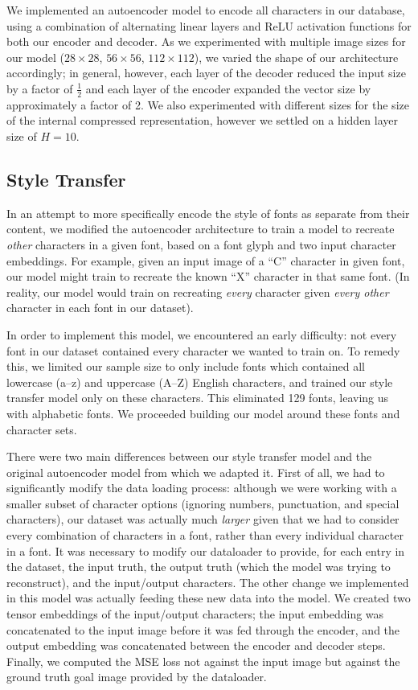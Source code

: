We implemented an autoencoder model to encode all characters in our database, using a combination of alternating linear layers and ReLU activation functions for both our encoder and decoder. As we experimented with multiple image sizes for our model ($28\times28$, $56\times56$, $112\times112$), we varied the shape of our architecture accordingly; in general, however, each layer of the decoder reduced the input size by a factor of $\frac{1}{2}$ and each layer of the encoder expanded the vector size by approximately a factor of 2. We also experimented with different sizes for the size of the internal compressed representation, however we settled on a hidden layer size of $H=10$.

\subsection{Style Transfer}

In an attempt to more specifically encode the style of fonts as separate from their content, we modified the autoencoder architecture to train a model to recreate \textit{other} characters in a given font, based on a font glyph and two input character embeddings. For example, given an input image of a ``C'' character in given font, our model might train to recreate the known ``X'' character in that same font. (In reality, our model would train on recreating \textit{every} character given \textit{every other} character in each font in our dataset).

In order to implement this model, we encountered an early difficulty: not every font in our dataset contained every character we wanted to train on. To remedy this, we limited our sample size to only include fonts which contained all lowercase (a–z) and uppercase (A–Z) English characters, and trained our style transfer model only on these characters. This eliminated 129 fonts, leaving us with alphabetic fonts. We proceeded building our model around these fonts and character sets.

There were two main differences between our style transfer model and the original autoencoder model from which we adapted it. First of all, we had to significantly modify the data loading process: although we were working with a smaller subset of character options (ignoring numbers, punctuation, and special characters), our dataset was actually much \textit{larger} given that we had to consider every combination of characters in a font, rather than every individual character in a font. It was necessary to modify our dataloader to provide, for each entry in the dataset, the input truth, the output truth (which the model was trying to reconstruct), and the input/output characters. The other change we implemented in this model was actually feeding these new data into the model. We created two tensor embeddings of the input/output characters; the input embedding was concatenated to the input image before it was fed through the encoder, and the output embedding was concatenated between the encoder and decoder steps. Finally, we computed the MSE loss not against the input image but against the ground truth goal image provided by the dataloader.

